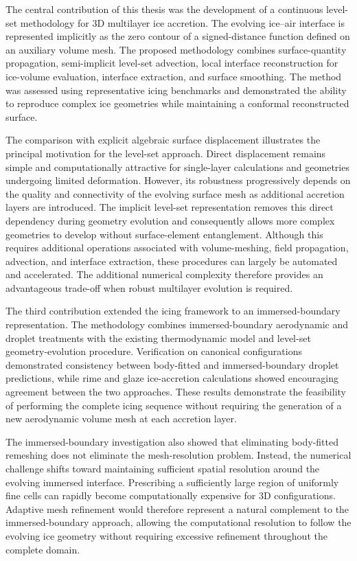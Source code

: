 The central contribution of this thesis was the development of a continuous level-set methodology for 3D multilayer ice accretion. The evolving ice--air interface is represented implicitly as the zero contour of a signed-distance function defined on an auxiliary volume mesh. The proposed methodology combines surface-quantity propagation, semi-implicit level-set advection, local interface reconstruction for ice-volume evaluation, interface extraction, and surface smoothing. The method was assessed using representative icing benchmarks and demonstrated the ability to reproduce complex ice geometries while maintaining a conformal reconstructed surface.

The comparison with explicit algebraic surface displacement illustrates the principal motivation for the level-set approach. Direct displacement remains simple and computationally attractive for single-layer calculations and geometries undergoing limited deformation. However, its robustness progressively depends on the quality and connectivity of the evolving surface mesh as additional accretion layers are introduced. The implicit level-set representation removes this direct dependency during geometry evolution and consequently allows more complex geometries to develop without surface-element entanglement. Although this requires additional operations associated with volume-meshing, field propagation, advection, and interface extraction, these procedures can largely be automated and accelerated. The additional numerical complexity therefore provides an advantageous trade-off when robust multilayer evolution is required.

The third contribution extended the icing framework to an immersed-boundary representation. The methodology combines immersed-boundary aerodynamic and droplet treatments with the existing thermodynamic model and level-set geometry-evolution procedure. Verification on canonical configurations demonstrated consistency between body-fitted and immersed-boundary droplet predictions, while rime and glaze ice-accretion calculations showed encouraging agreement between the two approaches. These results demonstrate the feasibility of performing the complete icing sequence without requiring the generation of a new aerodynamic volume mesh at each accretion layer.

The immersed-boundary investigation also showed that eliminating body-fitted remeshing does not eliminate the mesh-resolution problem. Instead, the numerical challenge shifts toward maintaining sufficient spatial resolution around the evolving immersed interface. Prescribing a sufficiently large region of uniformly fine cells can rapidly become computationally expensive for 3D configurations. Adaptive mesh refinement would therefore represent a natural complement to the immersed-boundary approach, allowing the computational resolution to follow the evolving ice geometry without requiring excessive refinement throughout the complete domain.


